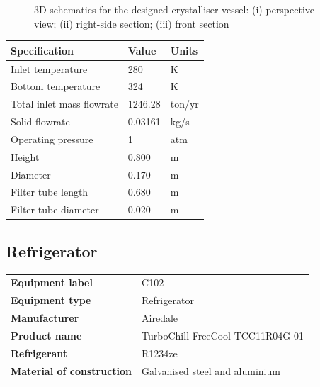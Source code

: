 \begin{figure}[H]
    \centering
    
    \caption{3D schematics for the designed crystalliser vessel: (i) perspective view; (ii) right-side section; (iii) front section}
    \label{fig:schematic wash column process design data sheet}
\end{figure}

\begin{table}[H]
\centering
\begin{tabular}{@{}l|l|l@{}}
\toprule
\textbf{Specification}                  & \textbf{Value}  & \textbf{Units}    \\ \midrule
Inlet temperature                       & 280             & K                \\ \midrule
Bottom temperature                      & 324             & K                \\ \midrule
Total inlet mass flowrate               & 1246.28         & ton/yr             \\ \midrule
Solid flowrate                          & 0.03161         & kg/s             \\ \midrule
Operating pressure                      & 1               & atm               \\ \midrule
Height                                  & 0.800           & m                 \\ \midrule
Diameter                                & 0.170           & m                 \\ \midrule
Filter tube length                      &  0.680          & m                 \\ \midrule
Filter tube diameter                    &  0.020          & m                  \\ \bottomrule
\end{tabular}
\end{table}
\newpage
\subsection{Refrigerator}

\begin{table}[H]
    \centering
    \begin{tabular}{@{}l|l@{}}
    \toprule
      \textbf{Equipment label}  & C102\\
       \textbf{Equipment type}  & Refrigerator \\
    \textbf{Manufacturer}  & Airedale \\
     \textbf{Product name}  & TurboChill FreeCool TCC11R04G-01 \\
          \textbf{Refrigerant}  & R1234ze \\
       \textbf{Material of construction} & Galvanised steel and aluminium \\
       \bottomrule
    \end{tabular}
\end{table}



